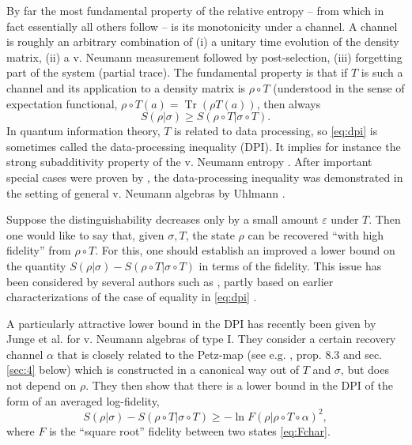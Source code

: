 \documentclass[english,a4paper,12pt]{article}
\newcommand{\ben}{\begin{equation}}
\newcommand{\een}{\end{equation}}
\newcommand{\tr}{\operatorname{Tr}}
\renewcommand{\log}{\operatorname{ln}}
\renewcommand{\epsilon}{\varepsilon}
\begin{document}
By far the most fundamental property of the relative entropy -- from which in fact essentially all others follow -- is its monotonicity under a channel. A channel is roughly an arbitrary combination of (i) a unitary time evolution of the density matrix, (ii) a v. Neumann measurement followed by post-selection, (iii) forgetting part of the system (partial trace). The fundamental property is that if $T$ is such a channel and its application to a density matrix is $\rho \circ T$
(understood in the sense of expectation functional, $\rho \circ T (a)=\tr(\rho T(a))$, then always
\ben\label{eq:dpi}
S(\rho | \sigma) \ge S( \rho \circ T| \sigma\circ T). 
\een
In quantum information theory, $T$ is related to data processing, so \eqref{eq:dpi} is sometimes called the data-processing inequality (DPI).
It implies for instance the strong subadditivity property of the v. Neumann entropy \cite{Lieb}. 
After important special cases were proven by \cite{Lindbladt,Araki1}, the data-processing inequality was demonstrated in the setting of general v. Neumann algebras
by Uhlmann \cite{Uhlmann1977}.

Suppose the distinguishability decreases only by a small amount $\epsilon$ under $T$. Then one would like to say that, given $\sigma, T$, 
the state $\rho$ can be recovered ``with high fidelity'' from $\rho\circ T$. For this, one should establish an improved a 
lower bound on the quantity $S(\rho | \sigma) - S( \rho \circ T | \sigma \circ T)$ in terms of the fidelity. 
This issue has been considered by several authors such as \cite{Junge, Berta, Wilde, Carlen, Jencova, Sutter, Sutter2}, 
partly based on earlier characterizations of the case of equality in \eqref{eq:dpi} \cite{Petz1,Petz2,Petz3,JencovaPetz}. 

A particularly attractive lower bound 
in the DPI has recently been given by Junge et al. \cite{Junge} for v. Neumann algebras of type I. 
They consider a certain recovery channel $\alpha$ that is closely related to the 
Petz-map (see e.g. \cite{Petz1993}, prop. 8.3 and sec. \ref{sec:4} below) which is constructed in a canonical way 
out of $T$ and $\sigma$, but does not depend on $\rho$. They then show that 
there is a lower bound in the DPI of the form of an averaged log-fidelity,  
\ben
\label{eq:dpiimp}
S(\rho | \sigma) - S( \rho \circ T| \sigma \circ T) \ge 
-\log 
F(\rho  | \rho \circ T \circ \alpha)^2 ,
\een
where $F$ is the ``square root'' fidelity between two states \eqref{eq:Fchar}.
\end{document}
